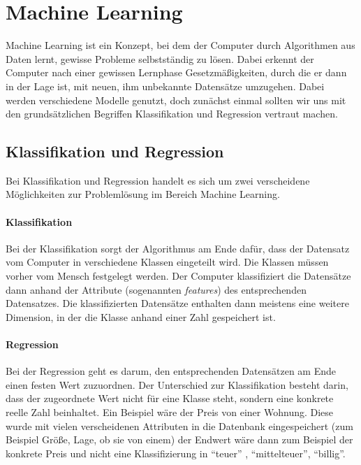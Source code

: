 \section{Machine Learning}
\author{Farhadiba Mohammed, Dennis Kempf, David Steinmann}
Machine Learning ist ein Konzept, bei dem der Computer durch Algorithmen aus Daten lernt, gewisse Probleme selbstständig zu lösen. Dabei erkennt der Computer nach einer gewissen Lernphase Gesetzmä\ss igkeiten, durch die er dann in der Lage ist, mit neuen, ihm unbekannte Datensätze umzugehen. Dabei werden verschiedene Modelle genutzt, doch zunächst einmal sollten wir uns mit den grundsätzlichen Begriffen Klassifikation und Regression vertraut machen.

\subsection{Klassifikation und Regression}
\author{David Steinmann}
Bei Klassifikation und Regression handelt es sich um zwei verscheidene Möglichkeiten zur Problemlösung im Bereich Machine Learning.

\paragraph{Klassifikation}
Bei der Klassifikation sorgt der Algorithmus am Ende dafür, dass der Datensatz vom Computer in verschiedene Klassen eingeteilt wird. Die Klassen müssen vorher vom Mensch festgelegt werden. Der Computer klassifiziert die Datensätze dann anhand der Attribute (sogenannten \emph{features}) des entsprechenden Datensatzes. Die klassifizierten Datensätze enthalten dann meistens eine weitere Dimension, in der die Klasse anhand einer Zahl gespeichert ist.

\paragraph{Regression}
Bei der Regression geht es darum, den entsprechenden Datensätzen am Ende einen festen Wert zuzuordnen. Der Unterschied zur Klassifikation besteht darin, dass der zugeordnete Wert nicht für eine Klasse steht, sondern eine konkrete reelle Zahl beinhaltet. Ein Beispiel wäre der Preis von einer Wohnung. Diese wurde mit vielen verscheidenen Attributen in die Datenbank eingespeichert (zum Beispiel Größe, Lage, ob sie von einem) der Endwert wäre dann zum Beispiel der konkrete Preis und nicht eine Klassifizierung in \enquote{teuer} , \enquote{mittelteuer}, \enquote{billig}. 


